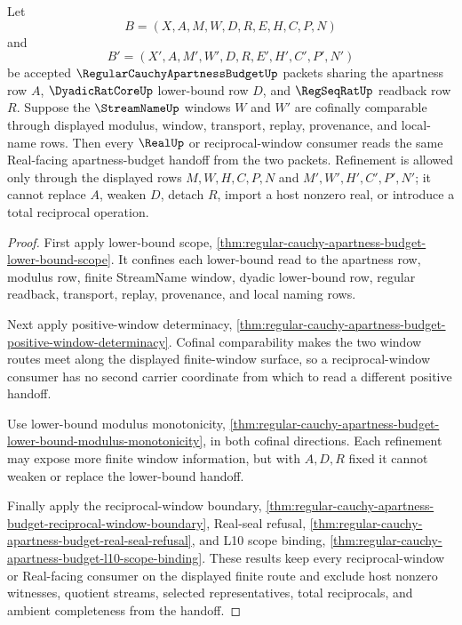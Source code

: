 \begin{theorem}
\label{thm:regular-cauchy-apartness-budget-formal-target}
Let
$$
B=(X,A,M,W,D,R,E,H,C,P,N)
$$
and
$$
B'=(X',A,M',W',D,R,E',H',C',P',N')
$$
be accepted $\RegularCauchyApartnessBudgetUp$ packets sharing the apartness row $A$, $\DyadicRatCoreUp$ lower-bound row $D$, and $\RegSeqRatUp$ readback row $R$. Suppose the $\StreamNameUp$ windows $W$ and $W'$ are cofinally comparable through displayed modulus, window, transport, replay, provenance, and local-name rows. Then every $\RealUp$ or reciprocal-window consumer reads the same Real-facing apartness-budget handoff from the two packets. Refinement is allowed only through the displayed rows $M,W,H,C,P,N$ and $M',W',H',C',P',N'$; it cannot replace $A$, weaken $D$, detach $R$, import a host nonzero real, or introduce a total reciprocal operation.
\end{theorem}
\begin{proof}
First apply lower-bound scope, \autoref{thm:regular-cauchy-apartness-budget-lower-bound-scope}. It confines each lower-bound read to the apartness row, modulus row, finite StreamName window, dyadic lower-bound row, regular readback, transport, replay, provenance, and local naming rows.

Next apply positive-window determinacy, \autoref{thm:regular-cauchy-apartness-budget-positive-window-determinacy}. Cofinal comparability makes the two window routes meet along the displayed finite-window surface, so a reciprocal-window consumer has no second carrier coordinate from which to read a different positive handoff.

Use lower-bound modulus monotonicity, \autoref{thm:regular-cauchy-apartness-budget-lower-bound-modulus-monotonicity}, in both cofinal directions. Each refinement may expose more finite window information, but with $A,D,R$ fixed it cannot weaken or replace the lower-bound handoff.

Finally apply the reciprocal-window boundary, \autoref{thm:regular-cauchy-apartness-budget-reciprocal-window-boundary}, Real-seal refusal, \autoref{thm:regular-cauchy-apartness-budget-real-seal-refusal}, and L10 scope binding, \autoref{thm:regular-cauchy-apartness-budget-l10-scope-binding}. These results keep every reciprocal-window or Real-facing consumer on the displayed finite route and exclude host nonzero witnesses, quotient streams, selected representatives, total reciprocals, and ambient completeness from the handoff.
\end{proof}

